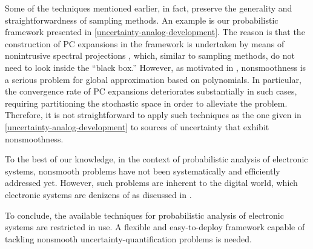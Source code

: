 Some of the techniques mentioned earlier, in fact, preserve the generality and
straightforwardness of sampling methods. An example is our probabilistic
framework presented in \cref{uncertainty-analog-development}. The reason is that
the construction of \ac{PC} expansions in the framework is undertaken by means
of nonintrusive spectral projections \cite{xiu2010}, which, similar to sampling
methods, do not need to look inside the ``black box.'' However, as motivated in
, nonsmoothness is a serious problem for global
approximation based on polynomials. In particular, the convergence rate of
\ac{PC} expansions deteriorates substantially in such cases, requiring
partitioning the stochastic space in order to alleviate the problem. Therefore,
it is not straightforward to apply such techniques as the one given in
\cref{uncertainty-analog-development} to sources of uncertainty that exhibit
nonsmoothness.

To the best of our knowledge, in the context of probabilistic analysis of
electronic systems, nonsmooth problems have not been systematically and
efficiently addressed yet. However, such problems are inherent to the digital
world, which electronic systems are denizens of as discussed in
.

To conclude, the available techniques for probabilistic analysis of electronic
systems are restricted in use. A flexible and easy-to-deploy framework capable
of tackling nonsmooth uncertainty-quantification problems is needed.
